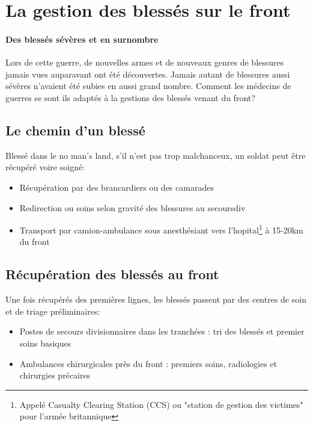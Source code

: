 \documentclass[a4paper, BCOR=0mm, fontsize=12pt, titlepage=firstiscover]{scrreprt}
\begin{document}
	\section{La gestion des blessés sur le front}
		\paragraph{Des blessés sévères et en surnombre}
		Lors de cette guerre, de nouvelles armes et de nouveaux genres de blessures jamais vues auparavant ont été découvertes.
		Jamais autant de blessures aussi sévères n'avaient été subies en aussi grand nombre.
		Comment les médecins de guerres se sont ils adaptés à la gestions des blessés venant du front?
		
		\subsection{Le chemin d'un blessé}
			Blessé dans le no man's land, s'il n'est pas trop malchanceux, un soldat peut être récupéré voire soigné:
			\begin{itemize}
				\item Récupération par des brancardiers ou des camarades
				\item Redirection ou soins selon gravité des blessures au \gls{secoursdiv}
				\item Transport par camion-ambulance sous anesthésiant vers l'\Gls{hopital}\footnote{Appelé Casualty Clearing Station (CCS) ou "station de gestion des victimes" pour l'armée britannique} à 15-20km du front

			\end{itemize}
		\subsection{Récupération des blessés au front}
			Une fois récupérés des premières lignes, les blessés passent par des centres de soin et de triage préliminaires:
			\begin{itemize}
				\item Postes de secours divisionnaires dans les tranchées : tri des blessés et premier soins basiques
				\item Ambulances chirurgicales près du front : premiers soins, radiologies et chirurgies précaires
			\end{itemize}
\end{document}
